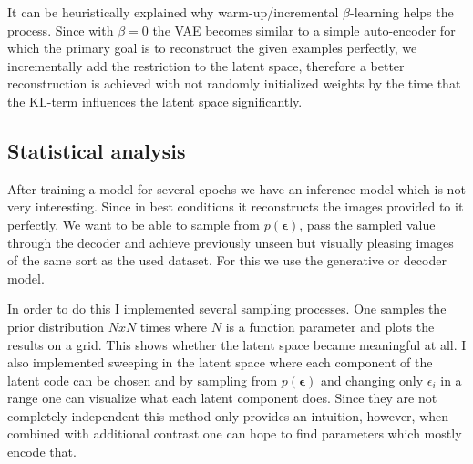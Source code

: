 \documentclass[12pt, english]{article}
\begin{document}
\vspace{4mm}

\par It can be heuristically explained why warm-up/incremental $\beta$-learning helps the process. Since with $\beta = 0$ the VAE becomes similar to a simple auto-encoder for which the primary goal is to reconstruct the given examples perfectly, we incrementally add the restriction to the latent space, therefore a better reconstruction is achieved with not randomly initialized weights by the time that the KL-term influences the latent space significantly.

\vspace{5mm}

\subsection{Statistical analysis}

\vspace{5mm}

\par After training a model for several epochs we have an inference model which is not very interesting. Since in best conditions it reconstructs the images provided to it perfectly. We want to be able to sample from $p(\bm{\epsilon})$, pass the sampled value through the decoder and achieve previously unseen but visually pleasing images of the same sort as the used dataset. For this we use the generative or decoder model. 

\vspace{4mm}

\par In order to do this I implemented several sampling processes. One samples the prior distribution $N x N$ times where $N$ is a function parameter and plots the results on a grid. This shows whether the latent space became meaningful at all. I also implemented sweeping in the latent space where each component of the latent code can be chosen and by sampling from $p(\bm{\epsilon})$ and changing only $\epsilon_{i}$ in a range one can visualize what each latent component does. Since they are not completely independent this method only provides an intuition, however, when combined with additional contrast one can hope to find parameters which mostly encode that.

\vspace{4mm}
\end{document}
